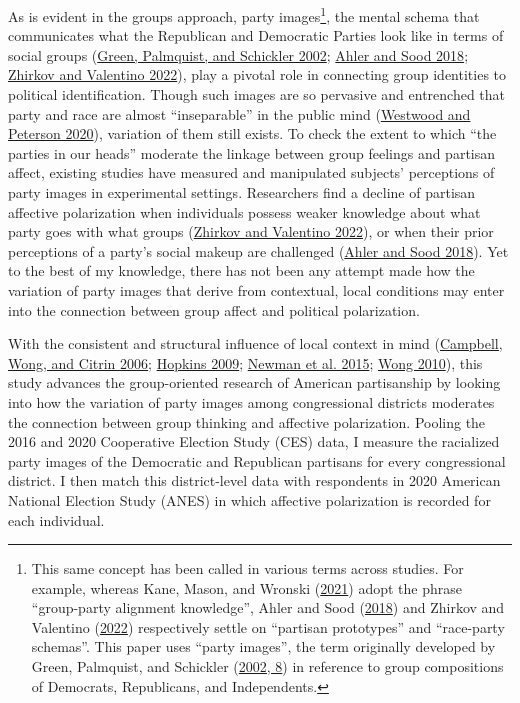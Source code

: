 \documentclass[
  12pt,
]{article}
\begin{document}
As is evident in the groups approach, party images\footnote{This same
  concept has been called in various terms across studies. For example,
  whereas Kane, Mason, and Wronski
  (\protect\hyperlink{ref-kane2021}{2021}) adopt the phrase
  ``group-party alignment knowledge'', Ahler and Sood
  (\protect\hyperlink{ref-ahler2018}{2018}) and Zhirkov and Valentino
  (\protect\hyperlink{ref-zhirkov2022}{2022}) respectively settle on
  ``partisan prototypes'' and ``race-party schemas''. This paper uses
  ``party images'', the term originally developed by Green, Palmquist,
  and Schickler (\protect\hyperlink{ref-green2002}{2002, 8}) in
  reference to group compositions of Democrats, Republicans, and
  Independents.}, the mental schema that communicates what the
Republican and Democratic Parties look like in terms of social groups
(\protect\hyperlink{ref-green2002}{Green, Palmquist, and Schickler
2002}; \protect\hyperlink{ref-ahler2018}{Ahler and Sood 2018};
\protect\hyperlink{ref-zhirkov2022}{Zhirkov and Valentino 2022}), play a
pivotal role in connecting group identities to political identification.
Though such images are so pervasive and entrenched that party and race
are almost ``inseparable'' in the public mind
(\protect\hyperlink{ref-westwood2020}{Westwood and Peterson 2020}),
variation of them still exists. To check the extent to which ``the
parties in our heads'' moderate the linkage between group feelings and
partisan affect, existing studies have measured and manipulated
subjects' perceptions of party images in experimental settings.
Researchers find a decline of partisan affective polarization when
individuals possess weaker knowledge about what party goes with what
groups (\protect\hyperlink{ref-zhirkov2022}{Zhirkov and Valentino
2022}), or when their prior perceptions of a party's social makeup are
challenged (\protect\hyperlink{ref-ahler2018}{Ahler and Sood 2018}). Yet
to the best of my knowledge, there has not been any attempt made how the
variation of party images that derive from contextual, local conditions
may enter into the connection between group affect and political
polarization.

With the consistent and structural influence of local context in mind
(\protect\hyperlink{ref-campbell2006}{Campbell, Wong, and Citrin 2006};
\protect\hyperlink{ref-hopkins2009}{Hopkins 2009};
\protect\hyperlink{ref-newman2015}{Newman et al. 2015};
\protect\hyperlink{ref-wong2010}{Wong 2010}), this study advances the
group-oriented research of American partisanship by looking into how the
variation of party images among congressional districts moderates the
connection between group thinking and affective polarization. Pooling
the 2016 and 2020 Cooperative Election Study (CES) data, I measure the
racialized party images of the Democratic and Republican partisans for
every congressional district. I then match this district-level data with
respondents in 2020 American National Election Study (ANES) in which
affective polarization is recorded for each individual.
\end{document}
